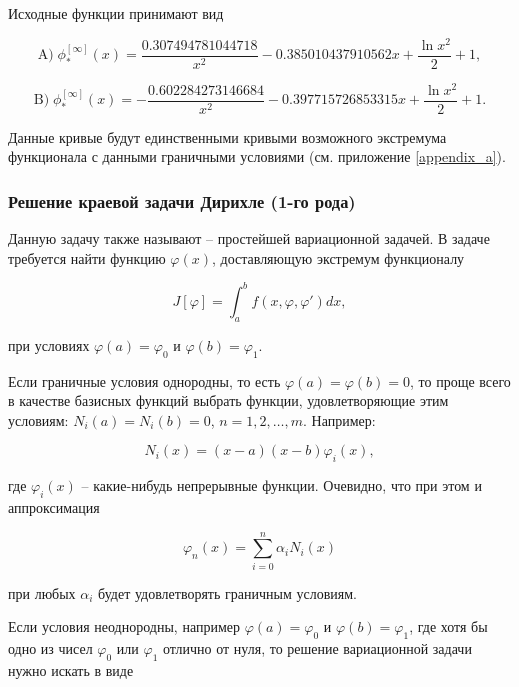 \documentclass{article}
\begin{document}
\noindent Исходные функции принимают вид

\begin{equation}
	\text{A)} \; \phi_{\ast}^{[\infty]}(x) = \frac{0.307494781044718}{x^2} - 0.385010437910562 x + \frac{\ln{x^2}}{2} + 1,
\end{equation}

\begin{equation}
	\text{B)} \; \phi_{\ast}^{[\infty]}(x) = - \frac{0.602284273146684}{x^2} - 0.397715726853315 x + \frac{\ln{x^2}}{2} + 1.
\end{equation}

Данные кривые будут единственными кривыми возможного экстремума функционала с данными граничными условиями (см. приложение \ref{appendix_a}). 

\subsubsection{Решение краевой задачи Дирихле (1-го рода)}

Данную задачу также называют – простейшей вариационной задачей. В задаче требуется найти функцию $\varphi(x)$, доставляющую экстремум функционалу

\begin{equation}
	J[\varphi] = \int_{a}^{b} f(x, \varphi, \varphi')dx,
\end{equation}

\noindent при условиях $\varphi(a) = \varphi_{0}$ и $\varphi(b) = \varphi_{1}$.

Если граничные условия однородны, то есть $\varphi(a) = \varphi(b) = 0$, то проще всего в качестве базисных функций выбрать функции, удовлетворяющие этим условиям: $N_{i}(a) = N_{i}(b) = 0$, $n = 1, 2, \ldots, m$. Например:

\begin{equation}
	N_{i}(x) = (x-a)(x-b)\varphi_{i}(x),
\end{equation}

\noindent где $\varphi_{i}(x)$ – какие-нибудь непрерывные функции. Очевидно, что при этом и аппроксимация 

\begin{equation}
	\varphi_{n}(x) = \sum_{i=0}^n \alpha_{i}N_{i}(x)
\end{equation}

\noindent при любых $\alpha_{i}$ будет удовлетворять граничным условиям.

Если условия неоднородны, например $\varphi(a) = \varphi_{0}$ и $\varphi(b) = \varphi_{1}$, где хотя бы одно из чисел $\varphi_{0}$ или $\varphi_{1}$ отлично от нуля, то решение вариационной задачи нужно искать в виде
\end{document}

